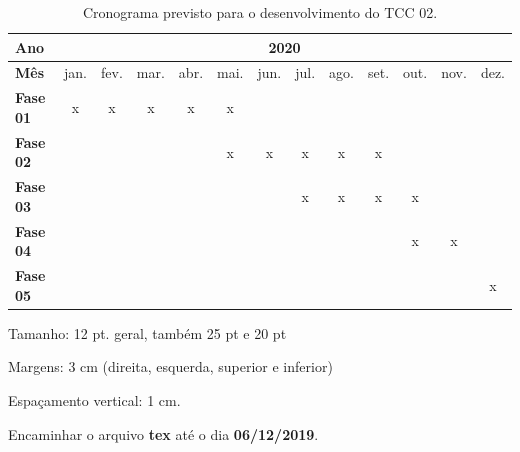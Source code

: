\documentclass[12pt, a4paper]{article}
\begin{document}
\vspace{-0.2\baselineskip}
\begin{table}[!h]
\caption{Cronograma previsto para o desenvolvimento do TCC 02.}
\begin{tabular}{|l|c|c|c|c|c|c|c|c|c|c|c|c|}
\hline
\textbf{Ano}     & \multicolumn{12}{c|}{\textbf{2020}}                                               \\ \hline
\textbf{Mês}     & jan. & fev. & mar. & abr. & mai. & jun. & jul. & ago. & set. & out. & nov. & dez. \\ \hline
\textbf{Fase 01} & x    & x    & x    & x    & x    &      &      &      &      &      &      &      \\ \hline
\textbf{Fase 02} &      &      &      &      & x    & x    & x    & x    & x    &      &      &      \\ \hline
\textbf{Fase 03} &      &      &      &      &      &      & x    & x    & x    & x    &      &      \\ \hline
\textbf{Fase 04} &      &      &      &      &      &      &      &      &      & x    & x    &      \\ \hline
\textbf{Fase 05} &      &      &      &      &      &      &      &      &      &      &      & x    \\ \hline
\end{tabular}
\end{table}


\noindent Tamanho: 12 pt. geral, também 25 pt e 20 pt
          
\noindent Margens: 3 cm (direita, esquerda, superior e inferior)
          
\noindent Espaçamento vertical: 1 cm.
          
\noindent Encaminhar o arquivo \textbf{tex} até o dia \textbf{06/12/2019}.
\end{document}
